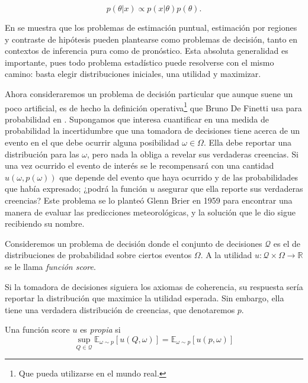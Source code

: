 \documentclass[main.tex]{subfiles}
\begin{document}
\begin{equation*}
	p(\theta | x ) 	\propto p(x|\theta)p(\theta).
\end{equation*}

En \cite{bernardo} se muestra que los problemas de estimación puntual, estimación por regiones y contraste de hipótesis pueden plantearse como problemas de decisión, tanto en contextos de inferencia pura como de pronóstico. Esta absoluta generalidad es importante, pues todo problema estadístico puede resolverse con el mismo camino: basta elegir distribuciones iniciales, una utilidad y maximizar.

Ahora consideraremos un problema de decisión particular que aunque suene un poco artificial, es de hecho la definición operativa\footnote{Que pueda utilizarse en el mundo real.} que Bruno De Finetti usa para probabilidad en \cite{definetti2008}.  Supongamos que interesa cuantificar en una medida de probabilidad la incertidumbre que una tomadora de decisiones tiene acerca de un evento en el que debe ocurrir alguna posibilidad  $\omega \in \Omega$. Ella debe reportar una distribución para las $\omega$, pero nada la obliga a revelar sus verdaderas creencias. Si una vez ocurrido el evento de interés se le recompensará con una cantidad $u(\omega,p(\omega))$ que depende del evento que haya ocurrido y de las probabilidades que había expresado; ¿podrá la función $u$  asegurar que ella reporte sus verdaderas creencias?  Este problema se lo planteó Glenn Brier en 1959 para encontrar una manera de evaluar las predicciones meteorológicas, y la solución que le dio sigue recibiendo su nombre. 

\begin{definition}
	Consideremos un problema de decisión donde el conjunto de decisiones $\mathcal{Q}$ es el de distribuciones de probabilidad sobre ciertos eventos $\Omega$. A la utilidad $u: \mathcal{Q}\times\Omega \to \mathbb{R}$ se le llama \textit{función score}.
\end{definition}

Si la tomadora de decisiones siguiera los axiomas de coherencia, su respuesta sería reportar la distribución que maximice la utilidad esperada. Sin embargo, ella tiene una verdadera distribución de creencias, que denotaremos $p$. 

\begin{definition}
	Una función score $u$ es \textit{propia} si
	\begin{equation*}
		\sup_{Q \in \mathcal{Q}} \mathbb{E}_{\omega\sim p}\left[u(Q,\omega)\right] = \mathbb{E}_{\omega\sim p}\left[u(p,\omega)\right]
	\end{equation*}
\end{definition}
\end{document}

